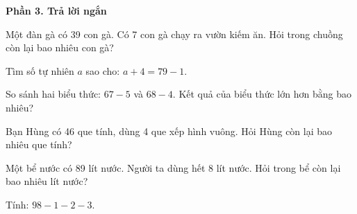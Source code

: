 \textbf{Phần 3. Trả lời ngắn}

\begin{ex} %
Một đàn gà có 39 con gà. Có 7 con gà chạy ra vườn kiếm ăn. Hỏi trong chuồng còn lại bao nhiêu con gà?
\end{ex}

\begin{ex} %
Tìm số tự nhiên $a$ sao cho: $a + 4 = 79 - 1$.
\end{ex}

\begin{ex} %
So sánh hai biểu thức: $67 - 5$ và $68 - 4$. Kết quả của biểu thức lớn hơn bằng bao nhiêu?
\end{ex}

\begin{ex} %
Bạn Hùng có 46 que tính, dùng 4 que xếp hình vuông. Hỏi Hùng còn lại bao nhiêu que tính?
\end{ex}

\begin{ex} %
Một bể nước có 89 lít nước. Người ta dùng hết 8 lít nước. Hỏi trong bể còn lại bao nhiêu lít nước?
\end{ex}

\begin{ex} %
Tính: $98 - 1 - 2 - 3$.
\end{ex}
